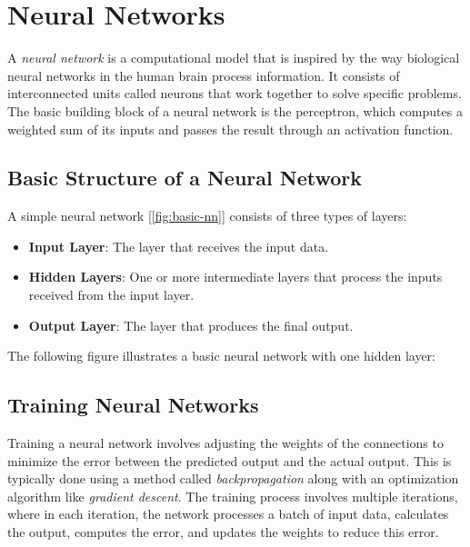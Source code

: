 \documentclass[../Thesis.tex]{subfiles}
\begin{document}
\section{Neural Networks}
\label{sec:neural_networks}

A \emph{neural network} is a computational model that is inspired by the way biological neural networks in the human brain process information. It consists of interconnected units called neurons that work together to solve specific problems. The basic building block of a neural network is the perceptron, which computes a weighted sum of its inputs and passes the result through an activation function.

\subsection{Basic Structure of a Neural Network}

A simple neural network [\autoref{fig:basic-nn}] consists of three types of layers:

\begin{itemize}
    \item \textbf{Input Layer}: The layer that receives the input data.
    \item \textbf{Hidden Layers}: One or more intermediate layers that process the inputs received from the input layer.
    \item \textbf{Output Layer}: The layer that produces the final output.
\end{itemize}

The following figure illustrates a basic neural network with one hidden layer:


\subsection{Training Neural Networks}
Training a neural network involves adjusting the weights of the connections to minimize the error between the predicted output and the actual output. This is typically done using a method called \emph{backpropagation} along with an optimization algorithm like \emph{gradient descent}. The training process involves multiple iterations, where in each iteration, the network processes a batch of input data, calculates the output, computes the error, and updates the weights to reduce this error.
\end{document}
